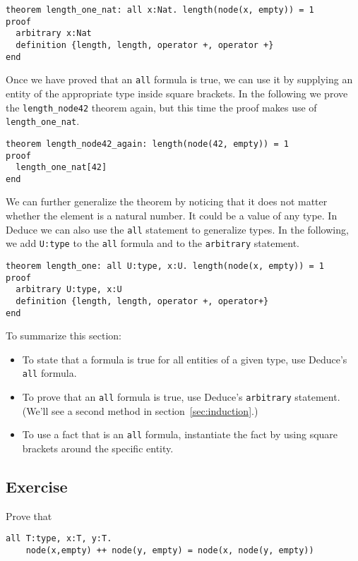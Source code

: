 \documentclass[12pt]{article}
\begin{document}
\begin{verbatim}
theorem length_one_nat: all x:Nat. length(node(x, empty)) = 1
proof
  arbitrary x:Nat
  definition {length, length, operator +, operator +}
end
\end{verbatim}

Once we have proved that an \texttt{all} formula is true, we can use it by
supplying an entity of the appropriate type inside square brackets. In
the following we prove the \texttt{length\_node42} theorem again, but this
time the proof makes use of \texttt{length\_one\_nat}.

\begin{verbatim}
theorem length_node42_again: length(node(42, empty)) = 1
proof
  length_one_nat[42]
end
\end{verbatim}

We can further generalize the theorem by noticing that it does not
matter whether the element is a natural number. It could be a value of
any type. In Deduce we can also use the \texttt{all} statement to
generalize types. In the following, we add \texttt{U:type} to the
\texttt{all} formula and to the \texttt{arbitrary} statement.

\begin{verbatim}
theorem length_one: all U:type, x:U. length(node(x, empty)) = 1
proof
  arbitrary U:type, x:U
  definition {length, length, operator +, operator+}
end
\end{verbatim}

To summarize this section:
\begin{itemize}
\item To state that a formula is true for all entities of a given
  type, use Deduce's \texttt{all} formula.
\item To prove that an \texttt{all} formula is true, use Deduce's
  \texttt{arbitrary} statement.  (We'll see a second method in 
  section~\ref{sec:induction}.)
\item To use a fact that is an \texttt{all} formula, instantiate the
  fact by using square brackets around the specific entity.
\end{itemize}

\subsection*{Exercise}

Prove that
\begin{verbatim}
all T:type, x:T, y:T. 
    node(x,empty) ++ node(y, empty) = node(x, node(y, empty))
\end{verbatim}
\end{document}
